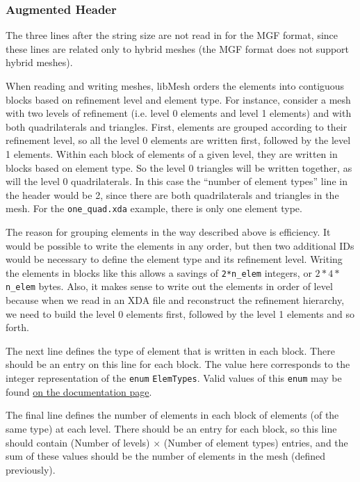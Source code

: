 \documentclass[12pt]{article}
\begin{document}
\subsubsection{Augmented Header}
The three lines after the string size are not read in for the MGF format, since these lines are related only to hybrid meshes (the MGF format does not support hybrid meshes).

When reading and writing meshes, libMesh orders the elements into contiguous blocks based on refinement level and element type.  For instance, consider a mesh with two levels of refinement (i.e. level 0 elements and level 1 elements) and with both quadrilaterals and triangles. First, elements are grouped according to their refinement level, so all the level 0 elements are written first, followed by the level 1 elements. Within each block of elements of a given level, they are written in blocks based on element type. So the level 0 triangles will be written together, as will the level 0 quadrilaterals. In this case the ``number of element types'' line in the header would be 2, since there are both quadrilaterals and triangles in the mesh.  For the \texttt{one\_quad.xda} example, there is only one element type.

The reason for grouping elements in the way described above is efficiency.  It would be possible to write the elements in any order, but then two additional IDs would be necessary to define the element type and its refinement level.  Writing the elements in blocks like this allows a savings of \texttt{2*n\_elem} integers, or $2*4*$\texttt{n\_elem} bytes. Also, it makes sense to write out the elements in order of level because when we read in an XDA file and reconstruct the refinement hierarchy, we need to build the level 0 elements first, followed by the level 1 elements and so forth.

The next line defines the type of element that is written in each block.  There should be an entry on this line for each block.  The value here corresponds to the integer representation of the \texttt{enum} \texttt{ElemTypes}.  Valid values of this \texttt{enum} may be found \href{http://libmesh.sourceforge.net/doxygen/namespacelibMeshEnums.html#a145}{on the documentation page}.

The final line defines the number of elements in each block of elements (of the same type) at each level. There should be an entry for each block, so this line
should contain (Number of levels) $\times$ (Number of element types) entries, 
and the sum of these values should be the number of elements in the mesh 
(defined previously).
\end{document}
